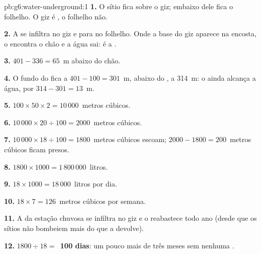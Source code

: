 \begin{solution}{pb:g6:water-underground:1}
\textbf{1.} O sítio fica sobre o giz; embaixo dele fica o folhelho. O giz
é , o folhelho não.

\textbf{2.} A  se infiltra no giz e para no folhelho. Onde a base do
giz aparece na encosta, o  encontra o chão e a água sai: é
a .

\textbf{3.} $401 - 336 = 65$~m abaixo do chão.

\textbf{4.} O fundo do  fica a $401 - 100 = 301$~m, abaixo do , a 314~m: o  ainda alcança a água, por $314 - 301 =
13$~m.

\textbf{5.} $100 \times 50 \times 2 = 10\,000$~metros cúbicos.

\textbf{6.} $10\,000 \times 20 \div 100 = 2000$~metros cúbicos.

\textbf{7.} $10\,000 \times 18 \div 100 = 1800$~metros cúbicos escoam;
$2000 - 1800 = 200$~metros cúbicos ficam presos.

\textbf{8.} $1800 \times 1000 = 1\,800\,000$~litros.

\textbf{9.} $18 \times 1000 = 18\,000$~litros por dia.

\textbf{10.} $18 \times 7 = 126$~metros cúbicos por semana.

\textbf{11.} A  da estação chuvosa se infiltra no giz e o reabastece
todo ano (desde que os sítios não bombeiem mais do que a  devolve).

\textbf{12.} $1800 \div 18 = $~\textbf{100 dias}: um pouco mais de três
meses sem nenhuma .
\end{solution}
